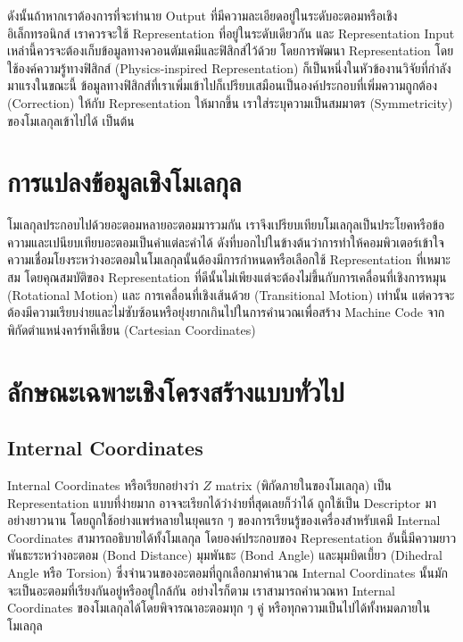 ดังนั้นถ้าหากเราต้องการที่จะทำนาย Output ที่มีความละเอียดอยู่ในระดับอะตอมหรือเชิงอิเล็กทรอนิกส์ เราควรจะใช้ Representation ที่อยู่ในระดับเดียวกัน 
และ Representation Input เหล่านี้ควรจะต้องเก็บข้อมูลทางควอนตัมเคมีและฟิสิกส์ไว้ด้วย โดยการพัฒนา Representation โดยใช้องค์ความรู้ทางฟิสิกส์
(Physics-inspired Representation) ก็เป็นหนึ่งในหัวข้องานวิจัยที่กำลังมาแรงในขณะนี้ ข้อมูลทางฟิสิกส์ที่เราเพิ่มเข้าไปก็เปรียบเสมือนเป็นองค์ประกอบที่เพิ่มความถูกต้อง
(Correction) ให้กับ Representation ให้มากขึ้น เราใส่ระบุความเป็นสมมาตร (Symmetricity) ของโมเลกุลเข้าไปได้ เป็นต้น 

\section{การแปลงข้อมูลเชิงโมเลกุล}

โมเลกุลประกอบไปด้วยอะตอมหลายอะตอมมารวมกัน เราจึงเปรียบเทียบโมเลกุลเป็นประโยคหรือข้อความและเปนียบเทียบอะตอมเป็นคำแต่ละคำได้
ดังที่บอกไปในข้างต้นว่าการทำให้คอมพิวเตอร์เข้าใจความเชื่อมโยงระหว่างอะตอมในโมเลกุลนั้นต้องมีการกำหนดหรือเลือกใช้ Representation ที่เหมาะสม
โดยคุณสมบัติของ Representation ที่ดีนั้นไม่เพียงแต่จะต้องไม่ขึ้นกับการเคลื่อนที่เชิงการหมุน (Rotational Motion) และ การเคลื่อนที่เชิงเส้นด้วย 
(Transitional Motion) เท่านั้น แต่ควรจะต้องมีความเรียบง่ายและไม่ซับซ้อนหรือยุ่งยากเกินไปในการคำนวณเพื่อสร้าง Machine Code 
จากพิกัดตำแหน่งคาร์ทคีเชียน (Cartesian Coordinates)

\section{ลักษณะเฉพาะเชิงโครงสร้างแบบทั่วไป}

\subsection{Internal Coordinates}

Internal Coordinates หรือเรียกอย่างว่า $Z$ matrix (พิกัดภายในของโมเลกุล) เป็น Representation แบบที่ง่ายมาก 
อาจจะเรียกได้ว่าง่ายที่สุดเลยก็ว่าได้ ถูกใช้เป็น Descriptor มาอย่างยาวนาน โดยถูกใช้อย่างแพร่หลายในยุคแรก ๆ ของการเรียนรู้ของเครื่องสำหรับเคมี
Internal Coordinates สามารถอธิบายได้ทั้งโมเลกุล โดยองค์ประกอบของ Representation อันนี้มีความยาวพันธะระหว่างอะตอม (Bond Distance) 
มุมพันธะ (Bond Angle) และมุมบิดเบี้ยว (Dihedral Angle หรือ Torsion) ซึ่งจำนวนของอะตอมที่ถูกเลือกมาคำนวณ Internal Coordinates 
นั้นมักจะเป็นอะตอมที่เรียงกันอยู่หรืออยู่ใกล้กัน อย่างไรก็ตาม เราสามารถคำนวณหา Internal Coordinates ของโมเลกุลได้โดยพิจารณาอะตอมทุก ๆ คู่
หรือทุกความเป็นไปได้ทั้งหมดภายในโมเลกุล

